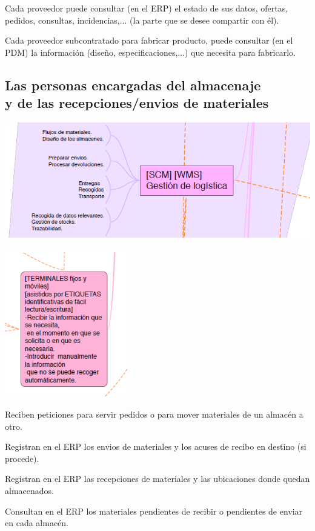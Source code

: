 \documentclass[spanish,12pt,a4paper,final,oneside]{book}
\begin{document}
Cada proveedor puede consultar (en el ERP) el estado de sus datos, ofertas, pedidos, consultas, incidencias,... (la parte que se desee compartir con él).

Cada proveedor subcontratado para fabricar producto, puede consultar (en el PDM) la información (diseño, especificaciones,...) que necesita para fabricarlo.

\subsection{Las personas encargadas del almacenaje\\y de las recepciones/envios de materiales}
\includegraphics[width=\textwidth]{subesquema - logistica01}
\\\\ \includegraphics[width=0.4\textwidth]{subesquema - logistica02}

Reciben peticiones para servir pedidos o para mover materiales de un almacén a otro.

Registran en el ERP los envios de materiales y los acuses de recibo en destino (si procede). 

Registran en el ERP las recepciones de materiales y las ubicaciones donde quedan almacenados.

Consultan en el ERP los materiales pendientes de recibir o pendientes de enviar en cada almacén.  
\end{document}
